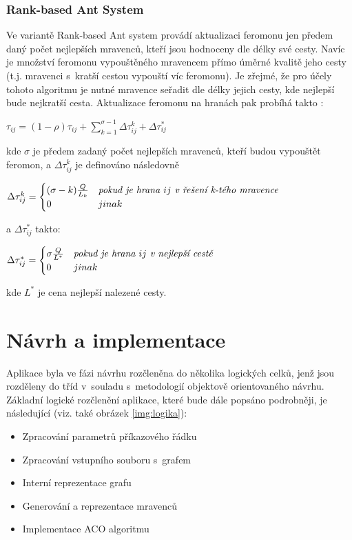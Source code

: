 \documentclass[a4paper, 12pt]{article}
\begin{document}
\subsubsection{Rank-based Ant System}
Ve variantě Rank-based Ant system provádí aktualizaci feromonu jen předem daný počet nejlepších mravenců, kteří jsou hodnoceny dle délky své cesty.
Navíc je množství feromonu vypouštěného mravencem přímo úměrné kvalitě jeho cesty (t.j. mravenci s~kratší cestou vypouští víc feromonu). Je zřejmé,
že pro účely tohoto algoritmu je nutné mravence seřadit dle délky jejich cesty, kde nejlepší bude nejkratší cesta. Aktualizace feromonu na hranách pak
probíhá takto \cite{aco:ranked}:
\begin{center}
  $\tau_{ij}=(1-\rho)\tau_{ij}+\sum\limits_{k=1}^{\sigma-1}\Delta\tau_{ij}^k + \Delta\tau_{ij}^*$
\end{center}
  kde $\sigma$ je předem zadaný počet nejlepších mravenců, kteří budou vypouštět feromon, a $\Delta\tau_{ij}^k$ je definováno následovně
\begin{center}
  $\Delta\tau_{ij}^k = 
 \begin{cases}
  (\sigma - k)\frac{Q}{L_k} & \emph{pokud je hrana } ij \emph{ v~řešení k-tého mravence}\\
  0 & jinak
 \end{cases}
$
\end{center}
a $\Delta\tau_{ij}^*$ takto:
\begin{center}
$\Delta\tau_{ij}^* = 
 \begin{cases}
  \sigma\frac{Q}{L^*} & \emph{pokud je hrana } ij \emph{ v~nejlepší cestě}\\
  0 & jinak
 \end{cases}
   $
\end{center}
kde $L^*$ je cena nejlepší nalezené cesty.

\section{Návrh a implementace}
\label{sec:design}
Aplikace byla ve fázi návrhu rozčleněna do několika logických celků, jenž jsou rozděleny do tříd v~souladu s~metodologií
objektově orientovaného návrhu. Základní logické rozčlenění aplikace, které bude dále popsáno podrobněji, je následující (viz. také obrázek
\ref{img:logika}):
\begin{itemize}
  \item Zpracování parametrů příkazového řádku
  \item Zpracování vstupního souboru s~grafem
  \item Interní reprezentace grafu
  \item Generování a reprezentace mravenců
  \item Implementace ACO algoritmu
\end{itemize}
\end{document}
